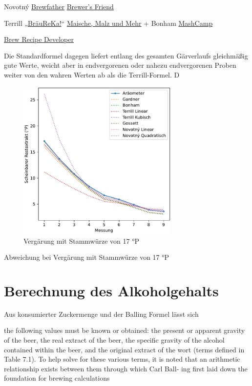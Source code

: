\documentclass[a4paper,parskip=half]{scrartcl}
\begin{document}
Novotný
\href{https://brewfather.app}{Brewfather}
\href{https://www.brewersfriend.com/refractometer-calculator}{Brewer's Friend}

Terrill
„\href{https://braureka.de/berechnungen/refraktometer-korrektur/}{BräuReKa!}“
\href{https://www.maischemalzundmehr.de/index.php?inhaltmitte=toolsrefraktorechner}{Maische, Malz und Mehr} + Bonham
\href{https://mashcamp.shop/brauberechnungen}{MashCamp}

\href{http://www.brewrecipedeveloper.de}{Brew Recipe Developer}

Die Standardformel dagegen liefert entlang des gesamten Gärverlaufs gleichmäßig gute Werte, weicht aber in endvergorenen oder nahezu endvergorenen Proben weiter von den wahren Werten ab als die Terrill-Formel. D
\autocite{Weiss2016}

\begin{figure}[h]
\centering
\includegraphics[width=8cm]{fermentation_graph.pdf}
\caption{Vergärung mit Stammwürze von 17 °P}
\label{fig:novotnygraph}
\end{figure}

\begin{table}[ht]
\centering

\caption{Abweichung bei Vergärung mit Stammwürze von 17 °P}
\label{table:novotnytable}
\end{table}

\section*{Berechnung des Alkoholgehalts}

Aus konsumierter Zuckermenge und der Balling Formel lässt sich

the following values must be known or
obtained: the present or apparent gravity of the beer, the real extract of the beer,
the specific gravity of the alcohol contained within the beer, and the original extract
of the wort (terms defined in Table 7.1). To help solve for these various terms, it is
noted that an arithmetic relationship exists between them through which Carl Ball-
ing first laid down the foundation for brewing calculations
\end{document}
